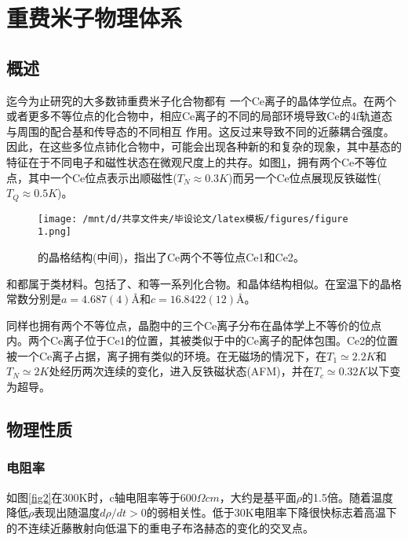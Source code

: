 \section{重费米子物理体系}
\subsection{概述}
迄今为止研究的大多数铈重费米子化合物都有 一个Ce离子的晶体学位点。在两个或者更多不等位点的化合物中，相应Ce离子的不同的局部环境导致Ce的4f轨道态与周围的配合基和传导态的不同相互 作用。这反过来导致不同的近藤耦合强度。因此，在这些多位点铈化合物中，可能会出现各种新的和复杂的现象，其中基态的特征在于不同电子和磁性状态在微观尺度上的共存。如图\ref{fig1}，拥有两个Ce不等位点，其中一个Ce位点表示出顺磁性($T_N \approx 0.3K$)而另一个Ce位点展现反铁磁性($T_Q \approx 0.5K$)。

\begin{figure}[h]
    \centering
    \texttt{[image: /mnt/d/共享文件夹/毕设论文/latex模板/figures/figure 1.png]}
    \caption{\Songti {}的晶格结构(中间)，指出了Ce两个不等位点Ce1和Ce2\cite{3}。}%
    \label{fig1}
\end{figure}


和都属于类材料。包括了、和等一系列化合物。和晶体结构相似。在室温下的晶格常数分别是$a=4.687(4)$\AA 和$c=16.8422(12)$\AA。

同样也拥有两个不等位点，晶胞中的三个Ce离子分布在晶体学上不等价的位点内。两个Ce离子位于Ce1的位置，其被类似于中的Ce离子的配体包围。Ce2的位置被一个Ce离子占据，离子拥有类似的环境。在无磁场的情况下，在$T_1 \simeq 2.2K$和$T_N \simeq 2K$处经历两次连续的变化，进入反铁磁状态(AFM)，并在$T_c \simeq 0.32K$以下变为超导。

\subsection{物理性质}
\subsubsection{电阻率}
如图\ref{fig2}在300K时，c轴电阻率等于$600 \Omega cm$，大约是基平面$\rho$的1.5倍。随着温度降低$\rho$表现出随温度$d \rho /d t > 0$的弱相关性。低于30K电阻率下降很快标志着高温下的不连续近藤散射向低温下的重电子布洛赫态的变化的交叉点。

